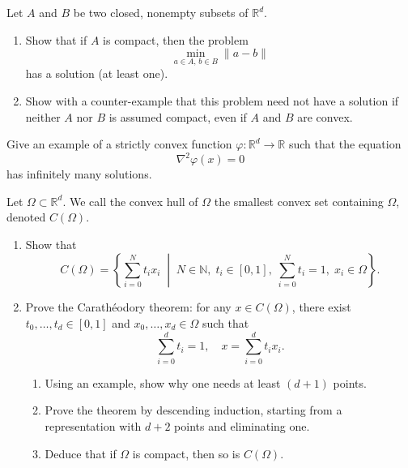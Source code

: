 

\begin{exercise}
Let $A$ and $B$ be two closed, nonempty subsets of $\mathbb{R}^d$.
\begin{enumerate}
  \item Show that if $A$ is compact, then the problem
  \[
    \min_{a \in A,\, b \in B} \|a-b\|
  \]
  has a solution (at least one).
  \item Show with a counter-example that this problem need not have a solution if neither $A$ nor $B$ is assumed compact, even if $A$ and $B$ are convex.
\end{enumerate}
\end{exercise}



\begin{exercise}
Give an example of a strictly convex function $\varphi : \mathbb{R}^d \to \mathbb{R}$ such that the equation
\[
\nabla^2 \varphi(x) = 0
\]
has infinitely many solutions.
\end{exercise}

\begin{exercise}
Let $\Omega \subset \mathbb{R}^d$. We call the convex hull of $\Omega$ the smallest convex set containing $\Omega$, denoted $C(\Omega)$.
\begin{enumerate}
  \item Show that
  \[
    C(\Omega) =
    \left\{ \sum_{i=0}^{N} t_i x_i \;\middle|\; N \in \mathbb{N}, \; t_i \in [0,1], \; \sum_{i=0}^{N} t_i = 1,\; x_i \in \Omega \right\}.
  \]
  \item Prove the Carathéodory theorem: for any $x \in C(\Omega)$, there exist $t_0, \dots, t_d \in [0,1]$ and $x_0, \dots, x_d \in \Omega$ such that
  \[
    \sum_{i=0}^d t_i = 1, 
    \quad 
    x = \sum_{i=0}^d t_i x_i.
  \]
  \begin{enumerate}
    \item Using an example, show why one needs at least $(d+1)$ points.
    \item Prove the theorem by descending induction, starting from a representation with $d+2$ points and eliminating one.
    \item Deduce that if $\Omega$ is compact, then so is $C(\Omega)$.
  \end{enumerate}
\end{enumerate}
\end{exercise}

